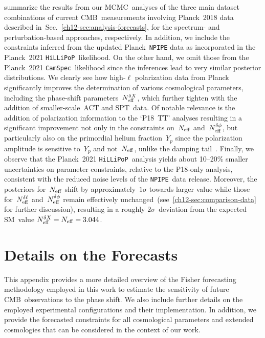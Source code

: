 \begin{subappendices}
\begin{table}
\begin{subtable}{\textwidth}
		\caption[Perturbation-based constraints on all cosmological parameters]{$\Lambda\mathrm{CDM} + \Nphase + \Neff + Y_p$}
\end{subtable}
	\caption[Full perturbation-based cosmological constraints]{Same as Table~\ref{ch12-tab:sbt_all}, but for the perturbation-based analyses.}
	\label{ch12-tab:pbt_all}
\end{table}
summarize the results from our MCMC~analyses of the three main dataset combinations of current CMB~measurements involving Planck~2018 data described in~Sec.~\ref{ch12-sec:analysis-forecasts}, for the spectrum- and perturbation-based approaches, respectively. In addition, we include the constraints inferred from the updated Planck~\texttt{NPIPE} data as incorporated in the Planck~2021 \texttt{HiLLiPoP}~likelihood. On the other hand, we omit those from the Planck~2021 \texttt{CamSpec}~likelihood since the inferences lead to very similar posterior distributions. We clearly see how high-$\ell$ polarization data from Planck significantly improves the determination of various cosmological parameters, including the phase-shift parameters~$N_\mathrm{eff}^{\delta X}$, which further tighten with the addition of smaller-scale~ACT and SPT~data. Of notable relevance is the addition of polarization information to the `P18~TT' analyses resulting in a significant improvement not only in the constraints on~$N_\mathrm{eff}$ and~$N_\mathrm{eff}^{\delta\phi}$, but particularly also on the primordial helium fraction~$Y_p$ since the polarization amplitude is sensitive to~$Y_p$ and not~$N_\mathrm{eff}$, unlike the damping tail~\cite{Baumann:2015rya}. Finally, we observe that the Planck~2021 \texttt{HiLLiPoP}~analysis yields about 10--20\% smaller uncertainties on parameter constraints, relative to the P18-only analysis, consistent with the reduced noise levels of the \texttt{NPIPE}~data release. Moreover, the posteriors for~$N_\mathrm{eff}$ shift by approximately~$1\sigma$ towards larger value while those for~$N_\mathrm{eff}^{\delta\ell}$ and~$N_\mathrm{eff}^{\delta\phi}$ remain effectively unchanged~(see~\textsection\ref{ch12-sec:comparison-data} for further discussion), resulting in a roughly $2\sigma$~deviation from the expected SM~value $N_\mathrm{eff}^{\delta X} = N_\mathrm{eff} = 3.044$.





\section{Details on the Forecasts}
\label{ch12-app:forecasts}

This appendix provides a more detailed overview of the Fisher forecasting methodology employed in this work to estimate the sensitivity of future CMB~observations to the phase shift. We also include further details on the employed experimental configurations and their implementation. In addition, we provide the forecasted constraints for all cosmological parameters and extended cosmologies that can be considered in the context of our work.\medskip


\end{subappendices}
